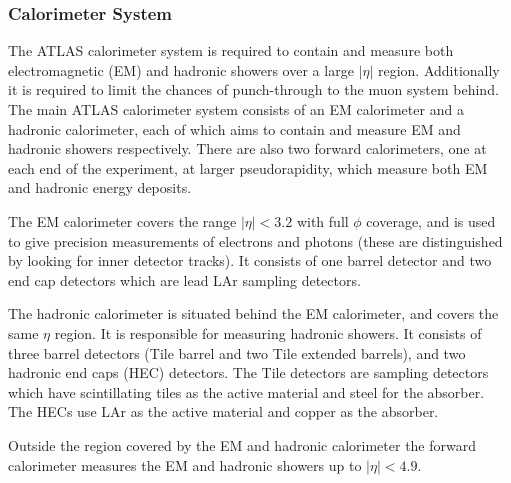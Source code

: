 \subsubsection{Calorimeter System}

The ATLAS calorimeter system is required to contain and measure both electromagnetic (EM) and hadronic showers over a large $|\eta|$ region. 
Additionally it is required to limit the chances of punch-through to the muon system behind. 
The main ATLAS calorimeter system consists of an EM calorimeter and a hadronic calorimeter, each of which aims to contain and measure EM and hadronic showers respectively. 
There are also two forward calorimeters, one at each end of the experiment, at larger pseudorapidity, which measure both EM and hadronic energy deposits.

The EM calorimeter covers the range $|\eta|<3.2$ with full $\phi$ coverage, and is used to give precision measurements of electrons and photons (these are distinguished by looking for inner detector tracks). 
It consists of one barrel detector and two end cap detectors which are lead LAr sampling detectors.


The hadronic calorimeter is situated behind the EM calorimeter, and covers the same $\eta$ region. 
It is responsible for measuring hadronic showers. 
It consists of three barrel detectors (Tile barrel and two Tile extended barrels), and two hadronic end caps (HEC) detectors. 
The Tile detectors are sampling detectors which have scintillating tiles as the active material and steel for the absorber. The HECs use LAr as the active material and copper as the absorber.


Outside the region covered by the EM and hadronic calorimeter the forward calorimeter measures the EM and hadronic showers up to $|\eta| <4.9$.

